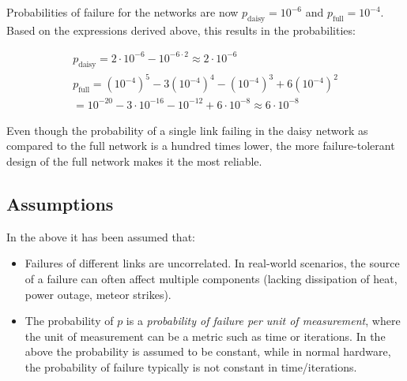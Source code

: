\documentclass[12pt]{article}
\begin{document}
Probabilities of failure for the networks are now $p_{\text{daisy}} = 10^{-6}$ and $p_{\text{full}} = 10^{-4}$. \\
Based on the expressions derived above, this results in the probabilities:

\begin{align*}
  p_{\text{daisy}} = 2\cdot10^{-6} - 10^{-6\cdot2} \approx 2\cdot10^{-6} \\
  p_{\text{full}} = (10^{-4})^5 - 3(10^{-4})^4 - (10^{-4})^3 + 6(10^{-4})^2 \\
  = 10^{-20} - 3\cdot10^{-16} - 10^{-12} + 6\cdot10^{-8} \approx 6\cdot10^{-8}
\end{align*}

Even though the probability of a single link failing in the daisy network as compared to the full network is a hundred times lower, the more failure-tolerant design of the full network makes it the most reliable.

\subsection*{Assumptions}

In the above it has been assumed that:
\begin{itemize}
  \item Failures of different links are uncorrelated. In real-world scenarios, the source of a failure can often affect multiple components (lacking dissipation of heat, power outage, meteor strikes).
  \item The probability of $p$ is a \emph{probability of failure per unit of measurement}, where the unit of measurement can be a metric such as time or iterations. In the above the probability is assumed to be constant, while in normal hardware, the probability of failure typically is not constant in time/iterations.
\end{itemize}
\end{document}
